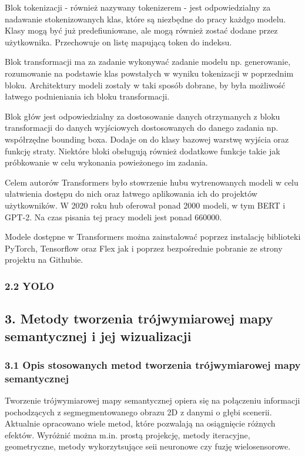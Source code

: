 \documentclass[
]{article}
\begin{document}
Blok tokenizacji - również nazywany tokenizerem - jest odpowiedzialny za nadawanie stokenizowanych klas, które są niezbędne do pracy każdgo modelu. Klasy mogą być już predefiuniowane, ale mogą również zostać dodane przez użytkownika. Przechowuje on listę mapującą token do indeksu.

Blok transformacji ma za zadanie wykonywać zadanie modelu np. generowanie, rozumowanie na podstawie klas powstałych w wyniku tokenizacji w poprzednim bloku. Architektury modeli zostały w taki sposób dobrane, by była możliwość łatwego podnieniania ich bloku transformacji.

Blok głów jest odpowiedzialny za dostosowanie danych otrzymanych z bloku transformacji do danych wyjściowych dostosowanych do danego zadania np. współrzędne bounding boxa. Dodaje on do klasy bazowej warstwę wyjścia oraz funkcję straty. Niektóre bloki obsługują również dodatkowe funkcje takie jak próbkowanie w celu wykonania powieżonego im zadania.

Celem autorów Transformers było stowrzenie hubu wytrenowanych modeli w celu ułatwienia dostępu do nich oraz łatwego aplikowania ich do projektów użytkowników. W 2020 roku hub oferował ponad 2000 modeli, w tym BERT i GPT-2. Na czas pisania tej pracy modeli jest ponad 660000.

Modele dostępne w Transformers można zainstalować poprzez instalację biblioteki PyTorch, Tensorflow oraz Flex jak i poprzez bezpośrednie pobranie ze strony projektu na Githubie.

\subsubsection{2.2 YOLO}\label{yolo}

\subsection{3. Metody tworzenia trójwymiarowej mapy semantycznej i jej wizualizacji}\label{metody-tworzenia-truxf3jwymiarowej-mapy-semantycznej-i-jej-wizualizacji}

\subsubsection{3.1 Opis stosowanych metod tworzenia trójwymiarowej mapy semantycznej}\label{opis-stosowanych-metod-tworzenia-truxf3jwymiarowej-mapy-semantycznej}

Tworzenie trójwymiarowej mapy semantycznej opiera się na połączeniu informacji pochodzących z segmegmentowanego obrazu 2D z danymi o głębi scenerii. Aktualnie opracowano wiele metod, które pozwalają na osiągnięcie różnych efektów. Wyróżnić można m.in. prostą projekcję, metody iteracyjne, geometryczne, metody wykorzytsujące seii neuronowe czy fuzję wielosensorowe.
\end{document}
